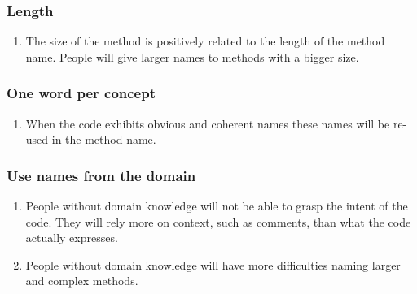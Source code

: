 \subsubsection{Length}
\begin{enumerate}
\item The size of the method is positively related to the length of the method name. People will give larger names to methods with a bigger size.
\end{enumerate}

\subsubsection{One word per concept}
\begin{enumerate}
\item When the code exhibits obvious and coherent names these names will be re-used in the method name.
\end{enumerate}

\subsubsection{Use names from the domain}
\begin{enumerate}
\item People without domain knowledge will not be able to grasp the intent of the code. They will rely more on context, such as comments, than what the code actually expresses.

\item People without domain knowledge will have more difficulties naming larger and complex methods.
\end{enumerate}








